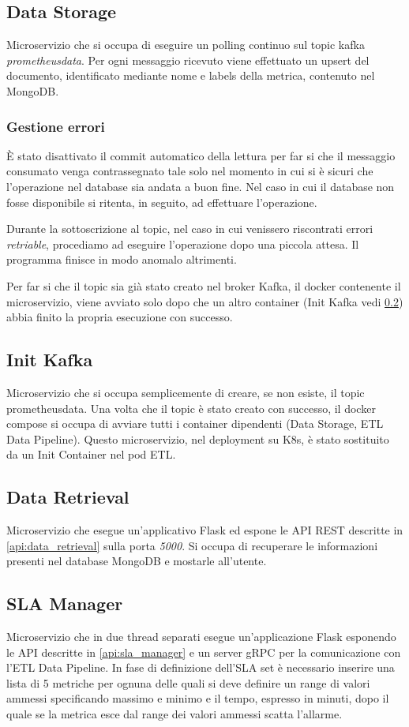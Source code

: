 \documentclass{article}
\begin{document}
    \subsection{Data Storage}
    Microservizio che si occupa di eseguire un polling continuo sul topic kafka \textit{prometheusdata}.
    Per ogni messaggio ricevuto viene effettuato un upsert del documento, identificato mediante nome e labels della metrica, contenuto nel MongoDB.
    \subsubsection{Gestione errori}
        È stato disattivato il commit automatico della lettura per far si che il messaggio consumato venga contrassegnato tale solo nel momento in cui si è sicuri che l'operazione nel database sia andata a buon fine. Nel caso in cui il database non fosse disponibile si ritenta, in seguito, ad effettuare l'operazione.
    
        Durante la sottoscrizione al topic, nel caso in cui venissero riscontrati errori \textit{retriable}, procediamo ad eseguire l'operazione dopo una piccola attesa. Il programma finisce in modo anomalo altrimenti.
    
        Per far si che il topic sia già stato creato nel broker Kafka, il docker contenente il microservizio, viene avviato solo dopo che un altro container (Init Kafka vedi \ref{sec:init_kafka}) abbia finito la propria esecuzione con successo.
    \subsection{Init Kafka}\label{sec:init_kafka}
    Microservizio che si occupa semplicemente di creare, se non esiste, il topic prometheusdata. Una volta che il topic è stato creato con successo, il docker compose si occupa di avviare tutti i container dipendenti (Data Storage, ETL Data Pipeline). Questo microservizio, nel deployment su K8s, è stato sostituito da un Init Container nel pod ETL.
    
    \subsection{Data Retrieval}
    Microservizio che esegue un'applicativo Flask ed espone le API REST descritte in \ref{api:data_retrieval} sulla porta \textit{5000}. Si occupa di recuperare le informazioni presenti nel database MongoDB e mostarle all'utente.
    
    \subsection{SLA Manager}
    Microservizio che in due thread separati esegue un'applicazione Flask esponendo le API descritte in \ref{api:sla_manager} e un server gRPC per la comunicazione con l'ETL Data Pipeline.
    In fase di definizione dell'SLA set è necessario inserire una lista di 5 metriche per ognuna delle quali si deve definire un range di valori ammessi specificando massimo e minimo e il tempo, espresso in minuti, dopo il quale se la metrica esce dal range dei valori ammessi scatta l'allarme.
\end{document}

